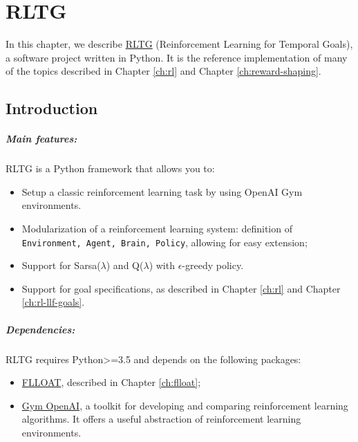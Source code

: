 \chapter{RLTG}\label{ch:rltg}
In this chapter, we describe \href{https://github.com/MarcoFavorito/rltg.git}{RLTG} (Reinforcement Learning for Temporal Goals), a software project written in Python.  It is the reference implementation of many of the topics described in Chapter \ref{ch:rl} and Chapter \ref{ch:reward-shaping}. 


\section{Introduction}
\paragraph{Main features:} RLTG is a Python framework that allows you to:
\begin{itemize}
	
	\item Setup a classic reinforcement learning task by using OpenAI Gym environments.
	\item Modularization of a reinforcement learning system: definition of \texttt{Environment, Agent, Brain, Policy}, allowing for easy extension;
	\item Support for Sarsa($\lambda$) and Q($\lambda$) with $\epsilon$-greedy policy.
	\item Support for \LLf goal specifications, as described in Chapter \ref{ch:rl} and Chapter \ref{ch:rl-llf-goals}.
	
\end{itemize}

\paragraph{Dependencies:} RLTG requires Python>=3.5 and depends on the following packages:
\begin{itemize}
	\item \href{https://github.com/MarcoFavorito/flloat.git}{FLLOAT}, described in Chapter \ref{ch:flloat};
	\item \href{https://gym.openai.com/}{Gym OpenAI}, a toolkit for developing and comparing reinforcement learning algorithms. It offers a useful abstraction of reinforcement learning environments.
\end{itemize}

